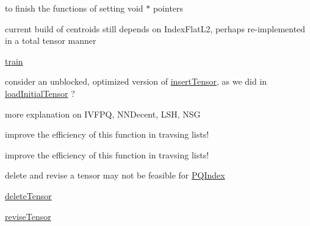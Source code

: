 
\begin{DoxyRefList}
\item[Class \mbox{\hyperlink{classCANDY_1_1CANDYObject}{CANDY\+::CANDYObject}} ]\label{todo__todo000001}%
%
to finish the functions of setting void $\ast$ pointers  
\item[Class \mbox{\hyperlink{classCANDY_1_1Clustering}{CANDY\+::Clustering}} ]\label{todo__todo000007}%
%
current build of centroids still depends on Index\+Flat\+L2, perhaps re-\/implemented in a total tensor manner
\begin{DoxyItemize}
\item \mbox{\hyperlink{classCANDY_1_1Clustering_a2e374f652394037161ed31e6b848e03a}{train}}  
\end{DoxyItemize}
\item[Class \mbox{\hyperlink{classCANDY_1_1DistributedPartitionIndex}{CANDY\+::Distributed\+Partition\+Index}} ]\label{todo__todo000002}%
%
consider an unblocked, optimized version of \mbox{\hyperlink{classCANDY_1_1DistributedPartitionIndex_aa232b9bce9ecc57c13efd748a246fb3d}{insert\+Tensor}}, as we did in \mbox{\hyperlink{classCANDY_1_1DistributedPartitionIndex_ab6db191148f7496633210a064ec1ea9c}{load\+Initial\+Tensor}} ?  
\item[Class \mbox{\hyperlink{classCANDY_1_1FaissIndex}{CANDY\+::Faiss\+Index}} ]\label{todo__todo000003}%
%
more explanation on IVFPQ, NNDecent, LSH, NSG  
\item[Member \mbox{\hyperlink{classCANDY_1_1IVFTensorEncodingList_a79005e2c50aed1cd435cef0bc6df2846}{CANDY\+::IVFTensor\+Encoding\+List\+::get\+Minimum\+Num\+Of\+Tensors\+Inside\+Bucket}} (torch\+::\+Tensor \&t, std\+::vector$<$ uint8\+\_\+t $>$ \&encode, uint64\+\_\+t bkt\+Idx, int64\+\_\+t minimum\+Num)]\label{todo__todo000004}%
%
improve the efficiency of this function in travsing lists!  
\item[Member \mbox{\hyperlink{classCANDY_1_1IVFTensorEncodingList_a4188159290de792c601da026d6256f99}{CANDY\+::IVFTensor\+Encoding\+List\+::get\+Minimum\+Num\+Of\+Tensors\+Inside\+Bucket\+Hamming}} (torch\+::\+Tensor \&t, std\+::vector$<$ uint8\+\_\+t $>$ \&encode, uint64\+\_\+t bkt\+Idx, int64\+\_\+t minimum\+Num)]\label{todo__todo000005}%
%
improve the efficiency of this function in travsing lists!  
\item[Class \mbox{\hyperlink{classCANDY_1_1PQIndex}{CANDY\+::PQIndex}} ]\label{todo__todo000008}%
%
delete and revise a tensor may not be feasible for \mbox{\hyperlink{classCANDY_1_1PQIndex}{PQIndex}}
\begin{DoxyItemize}
\item \mbox{\hyperlink{classCANDY_1_1PQIndex_ae459a19ecb3e94508f48e2c06d82b515}{delete\+Tensor}}
\item \mbox{\hyperlink{classCANDY_1_1PQIndex_a15d86a6b4b873b28ce693f088aa5a8bd}{revise\+Tensor}} 
\end{DoxyItemize}


\end{DoxyRefList}
